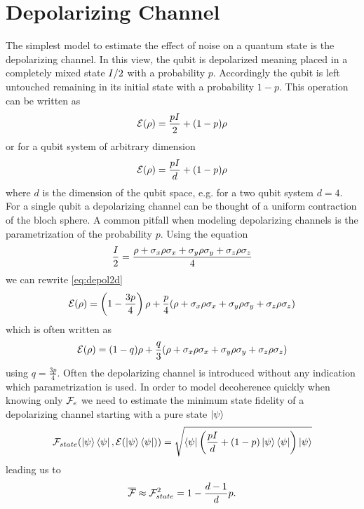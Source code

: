 \section{Depolarizing Channel}
The simplest model to  estimate the effect of noise on a quantum state is the depolarizing channel. In this view, the qubit is depolarized meaning placed in a completely mixed state $I/2$ with a probability $p$. Accordingly the qubit is left untouched remaining in its initial state with a probability $1-p$.
This operation can be written as
\begin{equation}
    \mathcal{E} (\rho)=\frac{pI}{2}+(1-p)\rho
    \label{eq:depol2d}
\end{equation}
or for a qubit system of arbitrary dimension
\begin{equation}
    \mathcal{E} (\rho)=\frac{pI}{d}+(1-p)\rho
\end{equation}
where $d$ is the dimension of the qubit space, e.g. for a two qubit system $d=4$. For a single qubit a depolarizing channel can be thought of a uniform contraction of the bloch sphere.
A common pitfall when modeling depolarizing channels is the parametrization of the probability $p$. Using the equation
\begin{equation}
    \frac{I}{2}=\frac{\rho+\sigma_x \rho \sigma_x + \sigma_y \rho \sigma_y +\sigma_z \rho \sigma_z }{4}
\end{equation}
we can rewrite \ref{eq:depol2d} 
\begin{equation}
    \mathcal{E} (\rho)=\left(1-\frac{3p}{4}\right)\rho+\frac{p}{4}(\rho+\sigma_x \rho \sigma_x + \sigma_y \rho \sigma_y +\sigma_z \rho \sigma_z )
\end{equation}
which is often written as
\begin{equation}
    \mathcal{E} (\rho)=(1-q) \rho+\frac{q}{3}(\rho+\sigma_x \rho \sigma_x + \sigma_y \rho \sigma_y +\sigma_z \rho \sigma_z )
\end{equation}
using $q=\frac{3p}{4}$. Often the depolarizing channel is introduced without any indication which parametrization is used.
In order to model decoherence quickly when knowing only $\mathcal{F}_e$ we need to estimate the minimum state fidelity of a depolarizing channel starting with a pure state $\ket{\psi}$
\begin{equation}
\mathcal{F}_{state}(\ket{\psi}\bra{\psi},\mathcal{E}(\ket{\psi}\bra{\psi}))=\sqrt{\bra{\psi} \left(\frac{pI}{d}+(1-p)\ket{\psi}\bra{\psi} \right) \ket{\psi}}
\end{equation}
leading us to
\begin{equation}
\overline{\mathcal{F}} \approx \mathcal{F}^2_{state} = 1-\frac{d-1}{d}p.
\end{equation}
